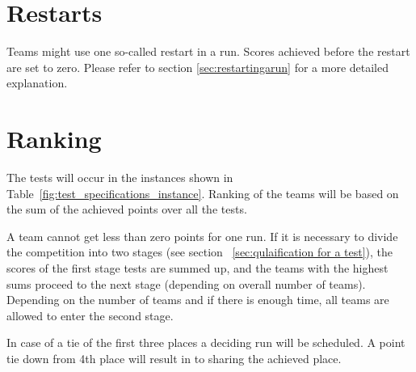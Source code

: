 \section{Restarts}
Teams might use one so-called restart in a run. Scores achieved before the restart are set to zero. Please refer to section \ref{sec:restartingarun} for a more detailed explanation.

\section{Ranking}
The tests will occur in the instances shown in Table~\ref{fig:test_specifications_instance}. Ranking of the teams will be based on the sum of the achieved points over all the tests.

A team cannot get less than zero points for one run. If it is necessary to divide the competition into two stages (see section ~\ref{sec:qulaification for a test}), the scores of the first stage tests are summed up, and the teams with the highest sums proceed to the next stage (depending on overall number of teams). Depending on the number of teams and if there is enough time, all teams are allowed to enter the second stage.

In case of a tie of the first three places a deciding run will be scheduled. A point tie down from 4th place will result in to sharing the achieved place. 


%
%
%


